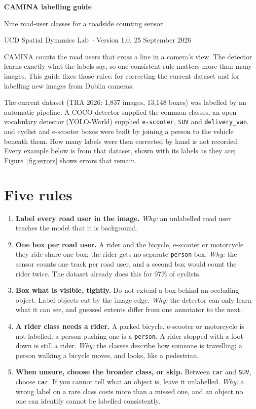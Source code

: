 \documentclass[11pt,a4paper]{article}
\newcommand{\cls}[1]{\texttt{#1}}
\begin{document}
{\LARGE\bfseries CAMINA labelling guide}\par\vspace{2pt}
{\large Nine road-user classes for a roadside counting sensor}\par\vspace{4pt}
{\small\color{black!60} UCD Spatial Dynamics Lab \quad·\quad Version 1.0, 25 September 2026}
\vspace{10pt}

CAMINA counts the road users that cross a line in a camera's view. The detector learns
exactly what the labels say, so one consistent rule matters more than many images. This
guide fixes those rules: for correcting the current dataset and for labelling new images
from Dublin cameras.

The current dataset (TRA 2026: 1,837 images, 13,148 boxes) was labelled by an automatic
pipeline. A COCO detector supplied the common classes, an open-vocabulary detector
(YOLO-World) supplied \cls{e-scooter}, \cls{SUV} and \cls{delivery\_van}, and cyclist and
e-scooter boxes were built by joining a person to the vehicle beneath them. How many labels
were then corrected by hand is not recorded. Every example below is from that dataset, shown
with its labels as they are; Figure~\ref{fig:errors} shows errors that remain.

\section*{Five rules}

\begin{enumerate}[leftmargin=*,label=\textbf{\arabic*.}]
  \item \textbf{Label every road user in the image.} \emph{Why:} an unlabelled road user
    teaches the model that it is background.
  \item \textbf{One box per road user.} A rider and the bicycle, e-scooter or motorcycle
    they ride share one box; the rider gets no separate \cls{person} box.
    \emph{Why:} the sensor counts one track per road user, and a second box would count the
    rider twice. The dataset already does this for 97\% of cyclists.
  \item \textbf{Box what is visible, tightly.} Do not extend a box behind an occluding
    object. Label objects cut by the image edge. \emph{Why:} the detector can only learn
    what it can see, and guessed extents differ from one annotator to the next.
  \item \textbf{A rider class needs a rider.} A parked bicycle, e-scooter or motorcycle is
    not labelled; a person pushing one is a \cls{person}. A rider stopped with a foot down
    is still a rider. \emph{Why:} the classes describe how someone is travelling; a person
    walking a bicycle moves, and looks, like a pedestrian.
  \item \textbf{When unsure, choose the broader class, or skip.} Between \cls{car} and
    \cls{SUV}, choose \cls{car}. If you cannot tell what an object is, leave it
    unlabelled. \emph{Why:} a wrong label on a rare class costs more than a missed one, and
    an object no one can identify cannot be labelled consistently.
\end{enumerate}
\end{document}
